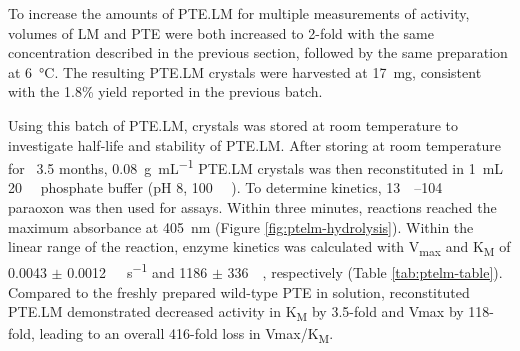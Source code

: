 \begin{refsection}
To increase the amounts of PTE.LM for multiple measurements of activity,
volumes of LM and PTE were both increased to 2-fold with the same concentration
described in the previous section, followed by the same preparation at
\SI{6}{\celsius}. The resulting PTE.LM crystals were harvested at \SI{17}{\mg},
consistent with the 1.8\% yield reported in the previous batch. 

Using this batch of PTE.LM, crystals was stored at room temperature to
investigate half-life and stability of PTE.LM. After storing at room
temperature for ~3.5 months, \SI{0.08}{\gram\per\mL} PTE.LM crystals was then
reconstituted in \SI{1}{\mL} \SI{20}{\milli\Molar} phosphate buffer (pH 8,
\SI{100}{\micro\Molar} ). To determine kinetics,
\SIrange{13}{104}{\micro\Molar} paraoxon was then used for assays.  Within
three minutes, reactions reached the maximum absorbance at \SI{405}{\nm}
(Figure \ref{fig:ptelm-hydrolysis}). Within the linear range of the reaction,
enzyme kinetics was calculated with V\textsubscript{max} and K\textsubscript{M}
of 0.0043 $\pm$ \SI{0.0012}{\micro\Molar\per\second} and 1186 $\pm$
\SI{336}{\micro\Molar}, respectively (Table \ref{tab:ptelm-table}).  Compared
to the freshly prepared wild-type PTE in solution, reconstituted PTE.LM
demonstrated decreased activity in K\textsubscript{M} by 3.5-fold and Vmax by
118-fold, leading to an overall 416-fold loss in Vmax/K\textsubscript{M}.  


\end{refsection}
